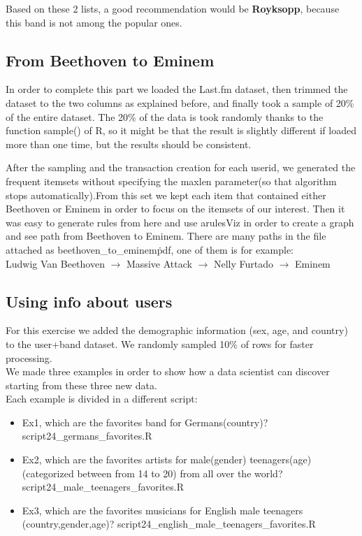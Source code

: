\documentclass[a4paper]{article}
\begin{document}
	\par\noindent Based on these 2 lists, a good recommendation would be \textbf{Royksopp}, because this band is not among the popular ones.
	
	\subsection{From Beethoven to Eminem}
	In order to complete this part we loaded the Last.fm dataset, then trimmed the dataset to the two columns as explained before, and finally took a sample of 20\% of the entire dataset. The 20\% of the data is took randomly thanks to the function sample() of R, so it might be that the result is slightly different if loaded more than one time, but the results should be consistent.
	
	After the sampling and the transaction creation for each userid, we generated the frequent itemsets without specifying the maxlen parameter(so that algorithm stops automatically).From this set we kept each item that contained either Beethoven or Eminem in order to focus on the itemsets of our interest. 
	Then it was easy to generate rules from here and use arulesViz in order to create a graph and see path from Beethoven to Eminem.
	There are many paths in the file attached as beethoven\_to\_eminem\.pdf, one of them is for example:\\
	Ludwig Van Beethoven $\rightarrow$ Massive Attack $\rightarrow$ Nelly Furtado $\rightarrow$ Eminem
	
	
	\subsection{Using info about users}
	For this exercise we added the demographic information (sex, age, and country) to the user+band dataset. We randomly sampled 10\% of rows for faster processing.\\
	We made three examples in order to show how a data scientist can discover starting from these three new data.\\
	Each example is divided in a different script:
	
	\begin{itemize}
		\item Ex1, which are the favorites band for Germans(country)? script24\_germans\_favorites.R
		\item Ex2, which are the favorites artists for male(gender) teenagers(age) (categorized between from 14 to 20) from all over the world? script24\_male\_teenagers\_favorites.R
		\item Ex3, which are the favorites musicians for English male teenagers (country,gender,age)? script24\_english\_male\_teenagers\_favorites.R
	\end{itemize}
	
\end{document}
